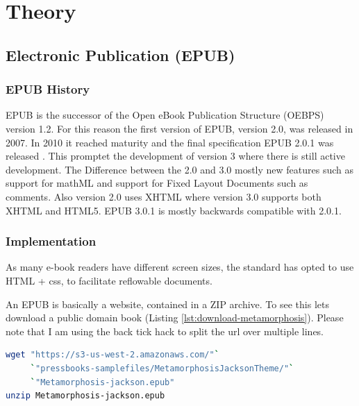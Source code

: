 \documentclass[]{report}   %
\begin{document}
\chapter{Theory}
\section{Electronic Publication (EPUB)}
\subsection{EPUB History}
EPUB is the successor of the Open eBook Publication Structure (OEBPS) version
1.2. For this reason the first version of EPUB, version 2.0, was released in
2007. In 2010 it reached maturity and the final specification EPUB 2.0.1 was
released . This promptet the development of version 3 where there
is still active development\cite{epub301}. The Difference between the 2.0 and
3.0 mostly new features such as support for mathML and support for Fixed Layout
Documents such as comments\cite{epub2to3}. Also version 2.0 uses XHTML where
version 3.0 supports both XHTML and HTML5. EPUB 3.0.1 is mostly backwards
compatible with 2.0.1\cite{epub2to3}. 

\subsection{Implementation}
As many e-book readers have different screen sizes, the standard has opted to
use HTML + css, to facilitate reflowable documents.

An EPUB is basically a website, contained in a ZIP archive. To see this lets download a public domain book (Listing \ref{lst:download-metamorphosis}). Please note that I am using the back tick hack to split the url over multiple lines.

\begin{minipage}{\linewidth}
\begin{lstlisting}[language=bash, label={lst:download-metamorphosis}, 
				   caption={Downloading and unzipping an ebook}]
wget "https://s3-us-west-2.amazonaws.com/"`
     `"pressbooks-samplefiles/MetamorphosisJacksonTheme/"`
     `"Metamorphosis-jackson.epub"
unzip Metamorphosis-jackson.epub
\end{lstlisting}
\end{minipage}
\end{document}
